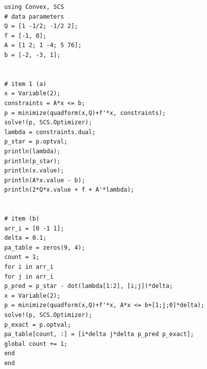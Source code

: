 \documentclass[12pt,a4paper]{article}
\begin{document}
\subanswer

\begin{verbatim}
    using Convex, SCS
    # data parameters
    Q = [1 -1/2; -1/2 2];
    f = [-1, 0];
    A = [1 2; 1 -4; 5 76];
    b = [-2, -3, 1];
    
    
    # item 1 (a)
    x = Variable(2);
    constraints = A*x <= b;
    p = minimize(quadform(x,Q)+f'*x, constraints);
    solve!(p, SCS.Optimizer);
    lambda = constraints.dual;
    p_star = p.optval;
    println(lambda);
    println(p_star);
    println(x.value);
    println(A*x.value - b);
    println(2*Q*x.value + f + A'*lambda);
    
    
    # item (b)
    arr_i = [0 -1 1];
    delta = 0.1;
    pa_table = zeros(9, 4);
    count = 1;
    for i in arr_i
    for j in arr_i
    p_pred = p_star - dot(lambda[1:2], [i;j])*delta;
    x = Variable(2);
    p = minimize(quadform(x,Q)+f'*x, A*x <= b+[1;j;0]*delta);
    solve!(p, SCS.Optimizer);
    p_exact = p.optval;
    pa_table[count, :] = [i*delta j*delta p_pred p_exact];
    global count += 1;
    end
    end
\end{verbatim}
\end{document}
